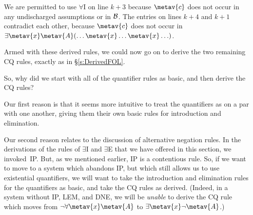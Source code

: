 \begin{fitchproof}
	\open
	\close
	\open
	\close
\end{fitchproof}\noindent
We are permitted to use $\forall$I on line $k+3$ because $\metav{c}$ does not occur in any  undischarged assumptions or in $\mathcal{B}$. The entries on lines $k+4$ and $k+1$ contradict each other, because $\metav{c}$ does not occur in $\exists \metav{x} \metav{A}(\ldots \metav{x} \ldots \metav{x} \ldots)$.

Armed with these derived rules, we could now go on to derive the two remaining CQ rules, exactly as in \S\ref{s:DerivedFOL}.

So, why did we start with all of the quantifier rules as basic, and then derive the CQ rules? 

Our first reason is that it seems more intuitive to treat the quantifiers as on a par with one another, giving them their own basic rules for introduction and elimination. 

Our second reason relates to the discussion of alternative negation rules. In the derivations of the rules of $\exists$I and $\exists$E that we have offered in this section, we invoked~IP.  But, as we mentioned earlier, IP is a contentious rule. So, if we want to move to a system which abandons IP, but which still allows us to use existential quantifiers, we will want to take the introduction and elimination rules for the quantifiers as basic, and take the CQ rules as derived. (Indeed, in a system without IP, LEM, and DNE, we will be \emph{unable} to derive the CQ rule which moves from $\enot \forall \metav{x} \metav{A}$ to $\exists \metav{x} \enot \metav{A}$.)
